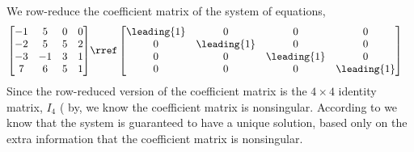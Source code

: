 We row-reduce the coefficient matrix of the system of equations,
%
\begin{align*}
\begin{bmatrix}
 -1 & 5 & 0 & 0  \\
 -2 & 5 & 5 & 2  \\
 -3 & -1 & 3 & 1  \\
 7 & 6 & 5 & 1 
\end{bmatrix}
&\rref
\begin{bmatrix}
 \leading{1} & 0 & 0 & 0  \\
 0 & \leading{1} & 0 & 0  \\
 0 & 0 & \leading{1} & 0  \\
 0 & 0 & 0 & \leading{1} 
\end{bmatrix}
\end{align*}
%
Since the row-reduced version of the coefficient matrix is the $4\times 4$ identity matrix, $I_4$ ( by, we know the coefficient matrix is nonsingular.  According to  we know that the system is guaranteed to have a unique solution, based only on the extra information that the coefficient matrix is nonsingular.
